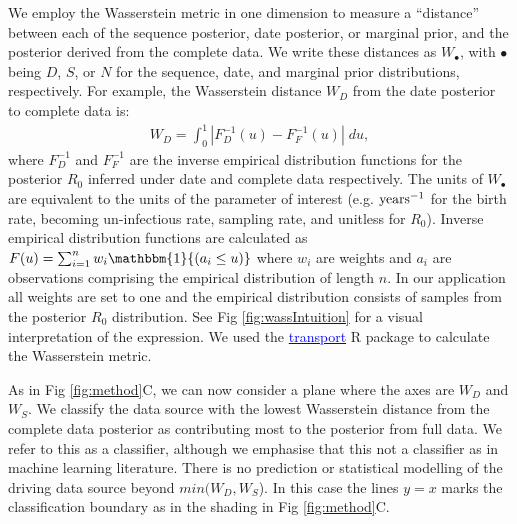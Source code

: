 \documentclass{article}
\begin{document}
We  employ the Wasserstein metric in one dimension to measure a ``distance'' between each of the sequence posterior, date posterior, or marginal prior, and the posterior derived from the complete data. We write these distances as $W_{\bullet}$, with $\bullet$ being $D$, $S$, or $N$ for the sequence, date, and marginal prior distributions, respectively. For example, the Wasserstein distance $W_D$ from the date posterior to complete data is:
\begin{align*}
W_D = \int_0^1 |F_{D}^{-1}(u)-F_{F}^{-1}(u)| \; du, 
\end{align*}
where $F_{D}^{-1}$ and $F_{F}^{-1}$ are the inverse empirical distribution functions for the posterior $R_{0}$ inferred under date and complete data respectively. The units of $W_{\bullet}$ are equivalent to the units of the parameter of interest (e.g. $\textnormal{years}^{-1}$ for the birth rate, becoming un-infectious rate, sampling rate, and unitless for $R_{0}$). Inverse empirical distribution functions are calculated as $F(u) = \sum_{i=1}^{n} w_{i}\mathbbm{1}{(a_{i}\leq u)}$ where $w_{i}$ are weights and $a_{i}$ are observations comprising the empirical distribution of length $n$. In our application all weights are set to one and the empirical distribution consists of samples from the posterior $R_{0}$ distribution. See Fig \ref{fig:wassIntuition} for a visual interpretation of the expression. We used the \href{https://www.rdocumentation.org/packages/transport/versions/0.12-2/topics/wasserstein1d}{\textcolor{blue}{transport}} R package to calculate the Wasserstein metric.

As in Fig \ref{fig:method}C, we can now consider a plane where the axes are $W_{D}$ and $W_{S}$. We classify the data source with the lowest Wasserstein distance from the complete data posterior as contributing most to the posterior from full data. We refer to this as a classifier, although we emphasise that this not a classifier as in machine learning literature. There is no prediction or statistical modelling of the driving data source beyond $min(W_{D}, W_{S}$). In this case the lines $y=x$ marks the classification boundary as in the shading in Fig \ref{fig:method}C. 
\end{document}
